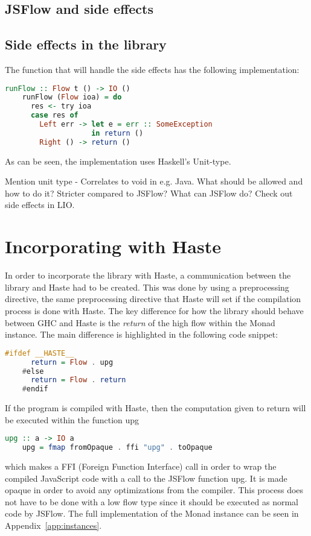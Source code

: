 \subsection{JSFlow and side effects}

\subsection{Side effects in the library}
The function that will handle the side effects has the following implementation:
\begin{center}
  \begin{lstlisting}[language=Haskell]
    runFlow :: Flow t () -> IO ()
    runFlow (Flow ioa) = do
      res <- try ioa
      case res of
        Left err -> let e = err :: SomeException
                    in return ()
        Right () -> return ()
  \end{lstlisting}
\end{center}
As can be seen, the implementation uses Haskell's Unit-type.

Mention unit type - Correlates to void in e.g. Java.
What should be allowed and how to do it?
Stricter compared to JSFlow?
What can JSFlow do?
Check out side effects in LIO.

\section{Incorporating with Haste}
In order to incorporate the library with Haste, a communication between the library and Haste had to be created. This was done by using a preprocessing directive, the same preprocessing directive that Haste will set if the compilation process is done with Haste. The key difference for how the library should behave between GHC and Haste is the \emph{return} of the high flow within the Monad instance. The main difference is highlighted in the following code snippet:
\begin{center}
  \begin{lstlisting}[language=Haskell]
    #ifdef __HASTE__
      return = Flow . upg
    #else
      return = Flow . return
    #endif
  \end{lstlisting}
\end{center}
If the program is compiled with Haste, then the computation given to return will be executed within the function upg
\begin{center}
  \begin{lstlisting}[language=Haskell]
    upg :: a -> IO a
    upg = fmap fromOpaque . ffi "upg" . toOpaque
  \end{lstlisting}
\end{center}
which makes a FFI (Foreign Function Interface) call in order to wrap the compiled JavaScript code with a call to the JSFlow function upg. It is made opaque in order to avoid any optimizations from the compiler. This process does not have to be done with a low flow type since it should be executed as normal code by JSFlow. The full implementation of the Monad instance can be seen in Appendix~\ref{app:instances}.


